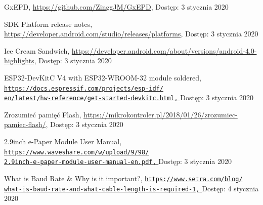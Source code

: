 \documentclass[a4paper,12pt, twoside]{article}
\begin{document}
\begin{thebibliography}{}
    		GxEPD,
    		\newline\url{https://github.com/ZinggJM/GxEPD}, 
    		\newline Dostęp: 3 stycznia 2020
    		
    		SDK Platform release notes,
    		\newline\url{https://developer.android.com/studio/releases/platforms}, 
    		\newline Dostęp: 3 stycznia 2020
    		
    		Ice Cream Sandwich,
    		\newline\url{https://developer.android.com/about/versions/android-4.0-highlights}, 
    		\newline Dostęp: 3 stycznia 2020
    		
    		 ESP32-DevKitC V4 with ESP32-WROOM-32 module soldered,
    		\newline\href{https://docs.espressif.com/projects/esp-idf/en/latest/hw-reference/get-started-devkitc.html}
    		 {\nolinkurl{https://docs.espressif.com/projects/esp-idf/}
                 \\
                  \nolinkurl{en/latest/hw-reference/get-started-devkitc.html,}
                 }
    		\newline Dostęp: 3 stycznia 2020
    		
    		Zrozumieć pamięć Flash,
    		\newline\url{https://mikrokontroler.pl/2018/01/26/zrozumiec-pamiec-flash/}, 
    		\newline Dostęp: 3 stycznia 2020
    		
    		2.9inch e-Paper Module User Manual,
    		\newline\href{https://www.waveshare.com/w/upload/9/98/2.9inch-e-paper-module-user-manual-en.pdf}
    		 {\nolinkurl{https://www.waveshare.com/w/upload/9/98/}
                 \\
                  \nolinkurl{2.9inch-e-paper-module-user-manual-en.pdf,}
                 }
    		\newline Dostęp: 3 stycznia 2020
    		
    		What is Baud Rate \& Why is it important?,
    		\newline\href{https://www.setra.com/blog/what-is-baud-rate-and-what-cable-length-is-required-1}
    		 {\nolinkurl{https://www.setra.com/blog/}
                 \\
                  \nolinkurl{what-is-baud-rate-and-what-cable-length-is-required-1,}
                 }
    		\newline Dostęp: 4 stycznia 2020
    		

\end{thebibliography}
\end{document}
